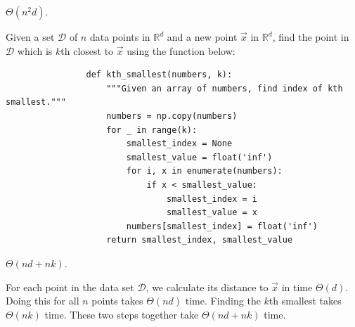 \begin{prob}
\begin{subprobset}
\begin{subprob}
            \begin{soln}
                $\Theta(n^2 d)$.
            \end{soln}
        \end{subprob}

        \begin{subprob}
            Given a set $\mathcal D$ of $n$ data points in $\mathbb R^d$ and a
            new point $\vec x$ in $\mathbb R^d$, find the point in $\mathcal D$
            which is $k$th closest to $\vec x$ using the 
            function below:

            \begin{verbatim}
                def kth_smallest(numbers, k):
                    """Given an array of numbers, find index of kth smallest."""
                    numbers = np.copy(numbers)
                    for _ in range(k):
                        smallest_index = None
                        smallest_value = float('inf')
                        for i, x in enumerate(numbers):
                            if x < smallest_value:
                                smallest_index = i
                                smallest_value = x
                        numbers[smallest_index] = float('inf')
                    return smallest_index, smallest_value
            \end{verbatim}

            \begin{soln}
                $\Theta(n d + nk)$.

                For each point in the data set $\mathcal D$, we calculate its distance
                to $\vec x$ in time $\Theta(d)$. Doing this for all $n$ points takes
                $\Theta(nd)$ time. Finding the $k$th smallest takes $\Theta(nk)$ time.
                These two steps together take $\Theta(nd + nk)$ time.
            \end{soln}
        \end{subprob}

    \end{subprobset}

\end{prob}
